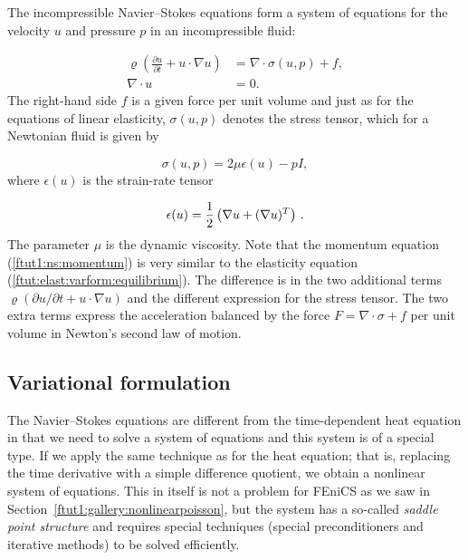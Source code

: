 \documentclass[graybox,envcountchap,sectrefs,final]{svmonodo}
\begin{document}
The incompressible Navier--Stokes equations form a system of equations
for the velocity $u$ and pressure $p$ in an incompressible fluid:

\begin{align}
  \label{ftut1:ns:momentum}
  \varrho\left(\frac{\partial u}{\partial t} +
  u \cdot \nabla u\right) &= \nabla\cdot\sigma(u, p) + f, \\
  \label{ftut1:ns:continuity}
  \nabla \cdot u &= 0.
\end{align}
The right-hand side $f$ is a given force per unit volume and
just as for the equations of linear elasticity,
$\sigma(u, p)$ denotes the stress tensor, which for a Newtonian fluid
is given by


\begin{equation}
  \sigma(u, p) = 2\mu\epsilon(u) - pI,
\end{equation}
where $\epsilon(u)$ is the strain-rate tensor


\[ \epsilon(u) = \frac{1}{2}\left(\nabla u + (\nabla u)^T\right)\thinspace .\]
The parameter $\mu$ is the dynamic viscosity. Note that the momentum
equation (\ref{ftut1:ns:momentum}) is very similar to the elasticity
equation (\ref{ftut:elast:varform:equilibrium}). The difference is in the
two additional terms $\varrho(\partial u / \partial t + u \cdot \nabla u)$ and the different
expression for the stress tensor. The two extra terms express the
acceleration balanced by the force $F = \nabla\cdot\sigma + f$ per unit volume in Newton's second law of motion.

\subsection{Variational formulation}
\label{ftut1:NS:varform}

The Navier--Stokes equations are different from
the time-dependent heat equation in that we need to solve a system of
equations and this system is of a special type. If we apply the same
technique as for the heat equation; that is, replacing the time
derivative with a simple difference quotient, we obtain a nonlinear
system of equations. This in
itself is not a problem for FEniCS as we saw in Section~\ref{ftut1:gallery:nonlinearpoisson}, but the system has a so-called
\emph{saddle point structure} and requires special techniques
(special preconditioners and iterative methods) to be solved efficiently.
\end{document}
